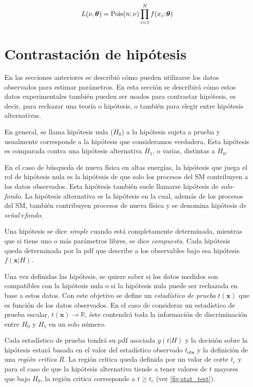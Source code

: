 \begin{equation}
  L(\nu,\bm{\theta}) = \operatorname{Pois}(n;\nu) \prod_{i=1}^{N} f(x_i; \bm{\theta})
  \label{eq:likelihood_ext}
\end{equation}


\section{Contrastación de hipótesis}
\label{sec:testhypo}

En las secciones anteriores se describió cómo pueden utilizarse los datos
observados para estimar parámetros. En esta sección se describirá cómo estos
datos experimentales también pueden ser usados para contrastar hipótesis, es
decir, para rechazar una teoría o hipótesis, o también para elegir
entre hipótesis alternativas.

En general, se llama hipótesis nula ($H_0$) a la hipótesis sujeta a prueba y
usualmente corresponde a la hipótesis que consideramos verdadera. Esta hipótesis
es comparada contra una hipótesis alternativa $H_1$, o varias, distintas a $H_0$.

En el caso de búsqueda de nueva física en altas energías, la hipótesis que juega el rol de
hipótesis nula es la hipótesis de que solo los procesos del SM contribuyen a los
datos observados. Esta hipótesis también suele llamarse hipótesis de
\emph{solo-fondo}. La hipótesis alternativa es la hipótesis en la cual, además
de los procesos del SM, también contribuyen procesos de nueva física y se
denomina hipótesis de \emph{se\~nal+fondo}.

Una hipótesis se dice \emph{simple} cuando está completamente determinada,
mientras que si tiene uno o más parámetros libres, se dice \emph{compuesta}.
Cada hipótesis queda determinada por la pdf que describe a los observables bajo
esa hipótesis $f(\bm{x}|H)$.

Una vez definidas las hipótesis, se quiere saber si los datos medidos son
compatibles con la hipótesis nula o si la hipótesis nula puede ser rechazada en
base a estos datos. Con este objetivo se define un \emph{estadístico de prueba}
$t(\bm{x})$ que es función de los datos observados. En el caso de considerar un
estadístico de prueba escalar, $t(\bm{x}) \to \mathbb{R}$, éste contendrá toda la
información de discriminación entre $H_0$ y $H_1$ en un solo número.

Cada estadístico de prueba tendrá su pdf asociada $g(t|H)$ y la decisión sobre
la hipótesis estará basada en el valor del estadístico observado $t_\text{obs}$
y la definición de una \emph{región critica} $R$. La región critica queda
definida por un valor de corte $t_c$ y para el caso de que la hipótesis
alternativa tiende a tener valores de $t$ mayores que bajo $H_0$, la región
critica corresponde a $t \geq t_c$ (ver \cref{fig:stat_test}).

